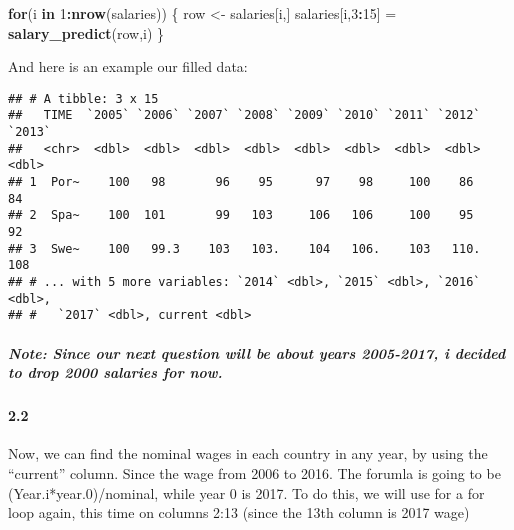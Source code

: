 \documentclass[]{article}
\newenvironment{Shaded}{\begin{snugshade}}{\end{snugshade}}
\newcommand{\KeywordTok}[1]{\textcolor[rgb]{0.13,0.29,0.53}{\textbf{#1}}}
\newcommand{\DataTypeTok}[1]{\textcolor[rgb]{0.13,0.29,0.53}{#1}}
\newcommand{\DecValTok}[1]{\textcolor[rgb]{0.00,0.00,0.81}{#1}}
\newcommand{\StringTok}[1]{\textcolor[rgb]{0.31,0.60,0.02}{#1}}
\newcommand{\ControlFlowTok}[1]{\textcolor[rgb]{0.13,0.29,0.53}{\textbf{#1}}}
\newcommand{\OperatorTok}[1]{\textcolor[rgb]{0.81,0.36,0.00}{\textbf{#1}}}
\newcommand{\NormalTok}[1]{#1}
\let\oldparagraph\paragraph
\renewcommand{\paragraph}[1]{\oldparagraph{#1}\mbox{}}
\let\oldsubparagraph\subparagraph
\renewcommand{\subparagraph}[1]{\oldsubparagraph{#1}\mbox{}}
\begin{document}
\begin{Shaded}
\begin{Highlighting}[]
\ControlFlowTok{for}\NormalTok{(i }\ControlFlowTok{in} \DecValTok{1}\OperatorTok{:}\KeywordTok{nrow}\NormalTok{(salaries)) \{}
\NormalTok{    row <-}\StringTok{ }\NormalTok{salaries[i,]}
\NormalTok{    salaries[i,}\DecValTok{3}\OperatorTok{:}\DecValTok{15}\NormalTok{] =}\StringTok{  }\KeywordTok{salary_predict}\NormalTok{(row,i)}
\NormalTok{\}}
\end{Highlighting}
\end{Shaded}

And here is an example our filled data:

\begin{verbatim}
## # A tibble: 3 x 15
##   TIME  `2005` `2006` `2007` `2008` `2009` `2010` `2011` `2012` `2013`
##   <chr>  <dbl>  <dbl>  <dbl>  <dbl>  <dbl>  <dbl>  <dbl>  <dbl>  <dbl>
## 1  Por~    100   98       96    95      97    98     100    86      84
## 2  Spa~    100  101       99   103     106   106     100    95      92
## 3  Swe~    100   99.3    103   103.    104   106.    103   110.    108
## # ... with 5 more variables: `2014` <dbl>, `2015` <dbl>, `2016` <dbl>,
## #   `2017` <dbl>, current <dbl>
\end{verbatim}

\subparagraph{Note: Since our next question will be about years
2005-2017, i decided to drop 2000 salaries for
now.}\label{note-since-our-next-question-will-be-about-years-2005-2017-i-decided-to-drop-2000-salaries-for-now.}

\paragraph{2.2}\label{section-5}

Now, we can find the nominal wages in each country in any year, by using
the ``current'' column. Since the wage from 2006 to 2016. The forumla is
going to be (Year.i*year.0)/nominal, while year 0 is 2017. To do this,
we will use for a for loop again, this time on columns 2:13 (since the
13th column is 2017 wage)

\begin{Shaded}
\end{Shaded}
\end{document}
